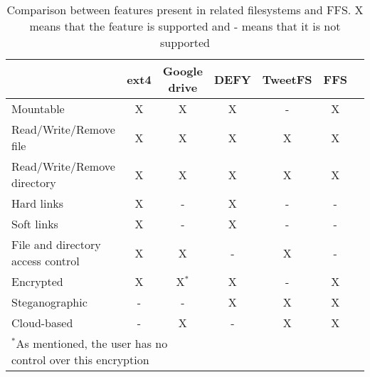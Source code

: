 \begin{table}[!ht]
	\begin{center}
		\begin{tabular}{ l || c | c | c | c | c | c }
			
			\hline
\hspace{1mm} 						& \textbf{ext4} 	& \textbf{Google drive} & \textbf{DEFY} 	& \textbf{TweetFS} 	& \textbf{FFS}\\
			
			\hline
			\hline
			
Mountable							& 	X 				& 	X					& 	X 				& 	-				& 	X\\
Read/Write/Remove file				& 	X 				& 	X					& 	X 				& 	X				& 	X\\
Read/Write/Remove directory 		& 	X 				& 	X					& 	X 				& 	X				& 	X\\
Hard links 							& 	X 				& 	-					& 	X 				& 	-				& 	-\\
Soft links 							& 	X 				& 	-					& 	X 				& 	-				& 	-\\
File and directory access control 	& 	X 				& 	X					& 	- 				& 	X				& 	-\\

Encrypted							&	X				&	X$^{*}$				&	X				&	-				&	X\\
Steganographic						&	-				&	-					&	X				&	X				&	X\\
Cloud-based							&	-				&	X					&	-				&	X				&	X\\

			\hline		

		\multicolumn{3}{l}{$^{*}$\footnotesize{As mentioned, the user has no control over this encryption}} \\

		\end{tabular}
		\caption{Comparison between features present in related filesystems and FFS. X means that the feature is supported and - means that it is not supported}
		\label{tbl:fs_comp}
	\end{center}

\end{table}

